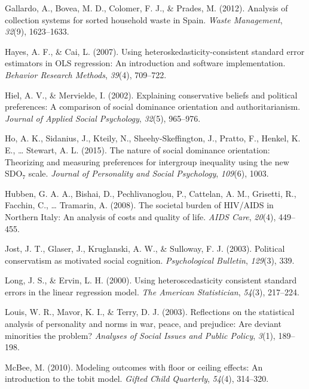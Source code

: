 \documentclass[english,man]{apa6}
\newcounter{author}
\theoremstyle{definition}
\theoremstyle{definition}
\theoremstyle{remark}
\begin{document}
\hypertarget{ref-gallardo2012analysis}{}
Gallardo, A., Bovea, M. D., Colomer, F. J., \& Prades, M. (2012).
Analysis of collection systems for sorted household waste in Spain.
\emph{Waste Management}, \emph{32}(9), 1623--1633.

\hypertarget{ref-hayes2007using}{}
Hayes, A. F., \& Cai, L. (2007). Using heteroskedasticity-consistent
standard error estimators in OLS regression: An introduction and
software implementation. \emph{Behavior Research Methods}, \emph{39}(4),
709--722.

\hypertarget{ref-hiel2002explaining}{}
Hiel, A. V., \& Mervielde, I. (2002). Explaining conservative beliefs
and political preferences: A comparison of social dominance orientation
and authoritarianism. \emph{Journal of Applied Social Psychology},
\emph{32}(5), 965--976.

\hypertarget{ref-ho2015nature}{}
Ho, A. K., Sidanius, J., Kteily, N., Sheehy-Skeffington, J., Pratto, F.,
Henkel, K. E., \ldots{} Stewart, A. L. (2015). The nature of social
dominance orientation: Theorizing and measuring preferences for
intergroup inequality using the new SDO\(_7\) scale. \emph{Journal of
Personality and Social Psychology}, \emph{109}(6), 1003.

\hypertarget{ref-hubben2008societal}{}
Hubben, G. A. A., Bishai, D., Pechlivanoglou, P., Cattelan, A. M.,
Grisetti, R., Facchin, C., \ldots{} Tramarin, A. (2008). The societal
burden of HIV/AIDS in Northern Italy: An analysis of costs and quality
of life. \emph{AIDS Care}, \emph{20}(4), 449--455.

\hypertarget{ref-jost2003political}{}
Jost, J. T., Glaser, J., Kruglanski, A. W., \& Sulloway, F. J. (2003).
Political conservatism as motivated social cognition.
\emph{Psychological Bulletin}, \emph{129}(3), 339.

\hypertarget{ref-long2000using}{}
Long, J. S., \& Ervin, L. H. (2000). Using heteroscedasticity consistent
standard errors in the linear regression model. \emph{The American
Statistician}, \emph{54}(3), 217--224.

\hypertarget{ref-louis2003reflections}{}
Louis, W. R., Mavor, K. I., \& Terry, D. J. (2003). Reflections on the
statistical analysis of personality and norms in war, peace, and
prejudice: Are deviant minorities the problem? \emph{Analyses of Social
Issues and Public Policy}, \emph{3}(1), 189--198.

\hypertarget{ref-mcbee2010modeling}{}
McBee, M. (2010). Modeling outcomes with floor or ceiling effects: An
introduction to the tobit model. \emph{Gifted Child Quarterly},
\emph{54}(4), 314--320.
\end{document}
